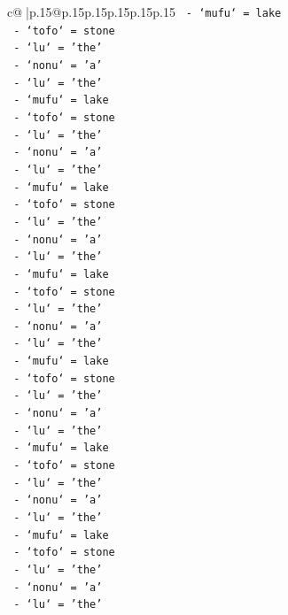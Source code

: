 \documentclass{article}
\begin{document}
{\begin{supertabular}{c@{$\;$}|p{.15\linewidth}@{}p{.15\linewidth}p{.15\linewidth}p{.15\linewidth}p{.15\linewidth}p{.15\linewidth}}
{{{\texttt{      {-} `mufu` = lake} \\
\texttt{      {-} `tofo` = stone} \\
\texttt{      {-} `lu` = 'the'} \\
\texttt{      {-} `nonu` = 'a'} \\
\texttt{      {-} `lu` = 'the'} \\
\texttt{      {-} `mufu` = lake} \\
\texttt{      {-} `tofo` = stone} \\
\texttt{      {-} `lu` = 'the'} \\
\texttt{      {-} `nonu` = 'a'} \\
\texttt{      {-} `lu` = 'the'} \\
\texttt{      {-} `mufu` = lake} \\
\texttt{      {-} `tofo` = stone} \\
\texttt{      {-} `lu` = 'the'} \\
\texttt{      {-} `nonu` = 'a'} \\
\texttt{      {-} `lu` = 'the'} \\
\texttt{      {-} `mufu` = lake} \\
\texttt{      {-} `tofo` = stone} \\
\texttt{      {-} `lu` = 'the'} \\
\texttt{      {-} `nonu` = 'a'} \\
\texttt{      {-} `lu` = 'the'} \\
\texttt{      {-} `mufu` = lake} \\
\texttt{      {-} `tofo` = stone} \\
\texttt{      {-} `lu` = 'the'} \\
\texttt{      {-} `nonu` = 'a'} \\
\texttt{      {-} `lu` = 'the'} \\
\texttt{      {-} `mufu` = lake} \\
\texttt{      {-} `tofo` = stone} \\
\texttt{      {-} `lu` = 'the'} \\
\texttt{      {-} `nonu` = 'a'} \\
\texttt{      {-} `lu` = 'the'} \\
\texttt{      {-} `mufu` = lake} \\
\texttt{      {-} `tofo` = stone} \\
\texttt{      {-} `lu` = 'the'} \\
\texttt{      {-} `nonu` = 'a'} \\
\texttt{      {-} `lu` = 'the'} \\
}}}
\end{supertabular}}
\end{document}
